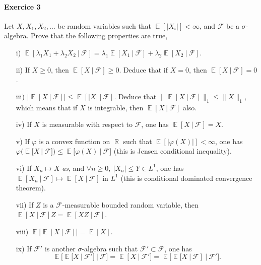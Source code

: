 \documentclass[10pt,a4paper]{article}
\theoremstyle{definition}
\numberwithin{equation}{section}
\DeclareMathOperator{\R}{\mathbb{R}}
\DeclareMathOperator{\E}{\mathbb{E}}
\begin{document}
\paragraph{Exercice 3}
Let $X,X_1,X_2,\dots$ be random variables such that $\E[|X_i|]<\infty$, and $\mathcal{F}$ be a $\sigma$-algebra. Prove that the following properties are true,
\begin{itemize}
\item[i)] $\E[\lambda_1 X_1 + \lambda_2 X_2~|~\mathcal{F}] =\lambda_1\E[X_1~|~\mathcal{F}]+\lambda_2\E[X_2~|~\mathcal{F}]$.
\item[ii)] If $X\geq 0$, then $\E[X~|~\mathcal{F}]\geq 0$. Deduce that if $X=0$, then $\E[X~|~\mathcal{F}]=0$.
\item[iii)] $\big|\E[X~|~\mathcal{F}]\big| \leq \E[|X|~|~\mathcal{F}]$. Deduce that $\|\E[X~|~\mathcal{F}]\|_1\leq \|X\|_1$, which means that if $X$ is integrable, then $\E[X~|~\mathcal{F}]$ also.
\item[iv)] If $X$ is measurable with respect to $\mathcal{F}$, one has $\E[X~|~\mathcal{F}] = X$.
\item[v)] If $\varphi$ is a convex function on $\R$ such that $\E[|\varphi(X)|] < \infty$, one has $\varphi\big(\E[X~|~\mathcal{F}]\big) \leq \E\big[\varphi(X)~|~\mathcal{F}\big]$   (this is Jensen conditional inequality).
\item[vi)] If $X_n\mapsto X$ \textit{as}, and $\forall n\geq 0, ~|X_n|\leq Y\in L^1$, one has $\E[X_n~|~\mathcal{F}]\mapsto\E[X~|~\mathcal{F}]$ in $L^1$   (this is conditional dominated convergence theorem).
\item[vii)] If $Z$ is a $\mathcal{F}$-measurable bounded random variable, then $\E[X~|~\mathcal{F}]Z=\E[XZ~|~\mathcal{F}]$.
\item[viii)] $\E\big[\E[X~|~\mathcal{F}]\big]=\E[X]$.
\item[ix)] If $\mathcal{F}'$ is another $\sigma$-algebra such that $\mathcal{F}'\subset \mathcal{F}$, one has 
$$\E\big[\E[X~|~\mathcal{F}']~|~\mathcal{F}\big]=\E[X~|~\mathcal{F}']=\E\big[\E[X~|~\mathcal{F}]~|~\mathcal{F}'\big].$$
\end{itemize}
\end{document}

